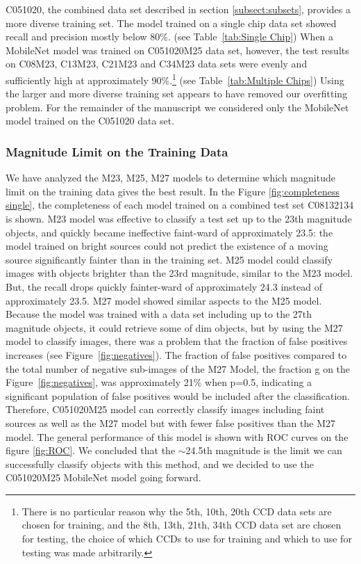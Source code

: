 \documentclass{aastex631}
\begin{document}
C051020, the combined data set described in section \ref{subsect:subsets}, provides a more diverse training set. 
The model trained on a single chip data set showed recall and precision mostly below 80\%. (see Table~\ref{tab:Single Chip})
When a MobileNet model was trained on C051020M25 data set, however, the test results on C08M23, C13M23, C21M23 and C34M23 data sets were evenly and sufficiently high at approximately 90\%.\footnote{There is no particular reason why the 5th, 10th, 20th CCD data sets are chosen for training, and the 8th, 13th, 21th, 34th CCD data set are chosen for testing, the choice of which CCDs to use for training and which to use for testing was made arbitrarily.} (see Table~\ref{tab:Multiple Chips})
Using the larger and more diverse training set appears to have removed our overfitting problem.
For the remainder of the manuscript we considered only the MobileNet model trained on the C051020 data set.

\subsubsection{Magnitude Limit on the Training Data}
\label{subsubsect: Magnitude Limit on the Training Data}
We have analyzed the M23, M25, M27 models to determine which magnitude limit on the training data gives the best result.
In the Figure \ref{fig:completeness single}, the completeness of each model trained on a combined test set C08132134 is shown.
M23 model was effective to classify a test set up to the 23th magnitude objects, and quickly became ineffective faint-ward of approximately 23.5: the model trained on bright sources could not predict the existence of a moving source significantly fainter than in the training set.
M25 model could classify images with objects brighter than the 23rd magnitude, similar to the M23 model.
But, the recall drops quickly fainter-ward of approximately 24.3 instead of approximately 23.5.
M27 model showed similar aspects to the M25 model.
Because the model was trained with a data set including up to the 27th magnitude objects, it could retrieve some of dim objects, but by using the M27 model to classify images, there was a problem that the fraction of false positives increases (see Figure~\ref{fig:negatives}).
The fraction of false positives compared to the total number of negative sub-images of the M27 Model, the fraction g on the Figure~\ref{fig:negatives}, was approximately 21\% when p=0.5, indicating a significant population of false positives would be included after the classification.
Therefore, C051020M25 model can correctly classify images including faint sources as well as the M27 model but with fewer false positives than the M27 model.
The general performance of this model is shown with ROC curves on the figure \ref{fig:ROC}.
We concluded that the $\sim$24.5th magnitude is the limit we can successfully classify objects with this method, and we decided to use the C051020M25 MobileNet model going forward.
\end{document}

